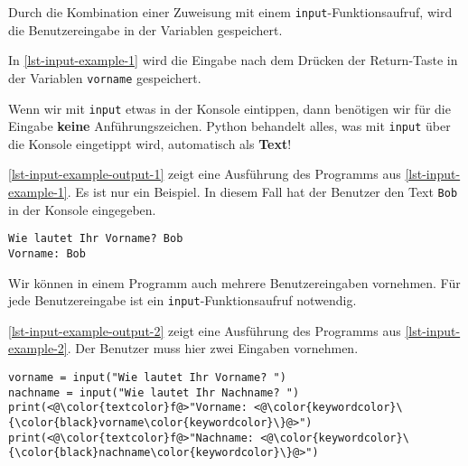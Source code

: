 Durch die Kombination einer Zuweisung mit einem \lstinline{input}-Funktionsaufruf, wird die Benutzereingabe in der Variablen gespeichert.

\begin{example}
	In \autoref{lst-input-example-1} wird die Eingabe nach dem Drücken der Return-Taste in der Variablen \lstinline{vorname} gespeichert.
\end{example}

\begin{important}
 Wenn wir mit \lstinline{input} etwas in der Konsole eintippen, dann benötigen wir für die Eingabe \textbf{keine} Anführungszeichen. Python behandelt alles, was mit \lstinline{input} über die Konsole eingetippt wird, automatisch als \textbf{Text}! 
\end{important}

\begin{example}
	\autoref{lst-input-example-output-1} zeigt eine Ausführung des Programms aus \autoref{lst-input-example-1}. Es ist nur ein Beispiel. In diesem Fall hat der Benutzer den Text \lstinline{Bob} in der Konsole eingegeben.
\end{example}

\begin{lstlisting}[caption={Beispielausführung für das Programm aus \autoref{lst-input-example-1}.}, label=lst-input-example-output-1, language=output]
Wie lautet Ihr Vorname? Bob
Vorname: Bob
\end{lstlisting}	

Wir können in einem Programm auch mehrere Benutzereingaben vornehmen. Für jede Benutzereingabe ist ein \lstinline{input}-Funktionsaufruf notwendig.

\begin{example}
	\autoref{lst-input-example-output-2} zeigt eine Ausführung des Programms aus \autoref{lst-input-example-2}. Der Benutzer muss hier zwei Eingaben vornehmen.
\end{example}

\begin{lstlisting}[caption={Zwei Eingaben in einem Programm (\graybgtexttt{input\_bsp\_2.py}).}, label={lst-input-example-2}]
vorname = input("Wie lautet Ihr Vorname? ")
nachname = input("Wie lautet Ihr Nachname? ")
print(<@\color{textcolor}f@>"Vorname: <@\color{keywordcolor}\{\color{black}vorname\color{keywordcolor}\}@>")
print(<@\color{textcolor}f@>"Nachname: <@\color{keywordcolor}\{\color{black}nachname\color{keywordcolor}\}@>")
\end{lstlisting}

